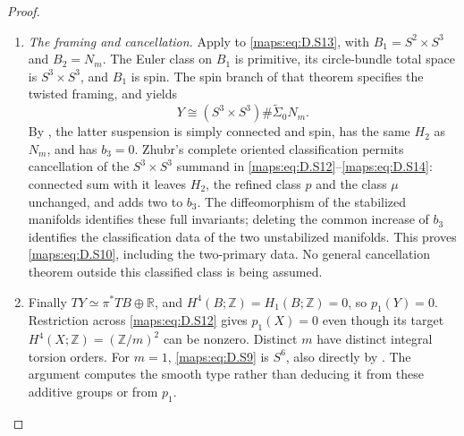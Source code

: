 \begin{proof}
\begin{enumerate}[label=\arabic*.,leftmargin=*]
\item \emph{The framing and cancellation.}
Apply \cite[Theorem A]{manGR25} to \eqref{maps:eq:D.S13}, with
$B_1=S^2\times S^3$ and $B_2=N_m$.
The Euler class on $B_1$ is primitive, its circle-bundle
total space is $S^3\times S^3$, and $B_1$ is spin.
The spin branch of that theorem specifies the twisted
framing, and yields
\[
          Y\cong(S^3\times S^3)\#\widetilde\Sigma_0 N_m.
 \tag{D.S14}\label{maps:eq:D.S14}
\]
By \cite[Lemma 5.2]{manGR25}, the latter suspension is
simply connected and spin, has the same $H_2$ as $N_m$,
and has $b_3=0$. Zhubr's complete oriented classification
\cite[Theorem 1]{manZhubr75} permits cancellation of the
$S^3\times S^3$ summand in \eqref{maps:eq:D.S12}--\eqref{maps:eq:D.S14}: connected
sum with it leaves $H_2$, the refined class $p$ and the
class $\mu$ unchanged, and adds two to $b_3$.
The diffeomorphism of the stabilized manifolds identifies
these full invariants; deleting the common increase of
$b_3$ identifies the classification data of the two
unstabilized manifolds. This proves \eqref{maps:eq:D.S10}, including
the two-primary data. No general cancellation theorem
outside this classified class is being assumed.

\item Finally $TY\simeq\pi^*TB\oplus\mathbb R$, and
$H^4(B;\mathbb Z)=H_1(B;\mathbb Z)=0$, so $p_1(Y)=0$.
Restriction across \eqref{maps:eq:D.S12} gives $p_1(X)=0$ even though
its target $H^4(X;\mathbb Z)=(\mathbb Z/m)^2$ can be
nonzero. Distinct $m$ have distinct integral torsion
orders. For $m=1$, \eqref{maps:eq:D.S9} is $S^6$, also directly by
\cite[Example 5.3(1)]{manGR25}.
The argument computes the smooth type rather than
deducing it from these additive groups or from $p_1$.
\end{enumerate}
\end{proof}

